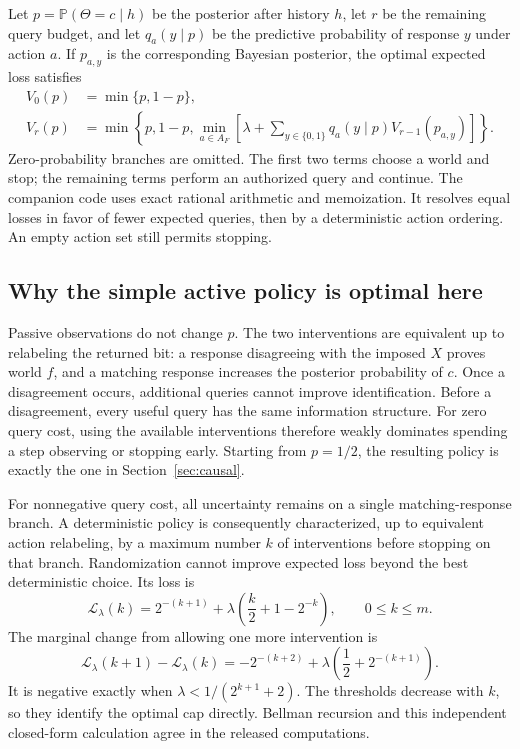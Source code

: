 \documentclass[11pt,letterpaper]{article}
\newcommand{\Prob}{\mathbb P}
\theoremstyle{remark}\newtheorem{remark}{Remark}[section]
\begin{document}
Let $p=\Prob(\Theta=c\mid h)$ be the posterior after history $h$, let $r$ be the remaining query budget, and let $q_a(y\mid p)$ be the predictive probability of response $y$ under action $a$. If $p_{a,y}$ is the corresponding Bayesian posterior, the optimal expected loss satisfies
\begin{align}
V_0(p)&=\min\{p,1-p\},\nonumber\\
V_r(p)&=\min\left\{p,1-p,\min_{a\in A_F}\left[\lambda+\sum_{y\in\{0,1\}}q_a(y\mid p)V_{r-1}(p_{a,y})\right]\right\}.
\label{eq:bellman}
\end{align}
Zero-probability branches are omitted. The first two terms choose a world and stop; the remaining terms perform an authorized query and continue. The companion code uses exact rational arithmetic and memoization. It resolves equal losses in favor of fewer expected queries, then by a deterministic action ordering. An empty action set still permits stopping.

\subsection{Why the simple active policy is optimal here}
Passive observations do not change $p$. The two interventions are equivalent up to relabeling the returned bit: a response disagreeing with the imposed $X$ proves world $f$, and a matching response increases the posterior probability of $c$. Once a disagreement occurs, additional queries cannot improve identification. Before a disagreement, every useful query has the same information structure. For zero query cost, using the available interventions therefore weakly dominates spending a step observing or stopping early. Starting from $p=1/2$, the resulting policy is exactly the one in Section~\ref{sec:causal}.

For nonnegative query cost, all uncertainty remains on a single matching-response branch. A deterministic policy is consequently characterized, up to equivalent action relabeling, by a maximum number $k$ of interventions before stopping on that branch. Randomization cannot improve expected loss beyond the best deterministic choice. Its loss is
\begin{equation}
\mathcal L_\lambda(k)=2^{-(k+1)}+\lambda\left(\frac{k}{2}+1-2^{-k}\right),\qquad 0\leq k\leq m.
\label{eq:caploss}
\end{equation}
The marginal change from allowing one more intervention is
\begin{equation}
\mathcal L_\lambda(k+1)-\mathcal L_\lambda(k)
=-2^{-(k+2)}+\lambda\left(\frac12+2^{-(k+1)}\right).
\label{eq:threshold}
\end{equation}
It is negative exactly when $\lambda<1/(2^{k+1}+2)$. The thresholds decrease with $k$, so they identify the optimal cap directly. Bellman recursion and this independent closed-form calculation agree in the released computations.
\end{document}

